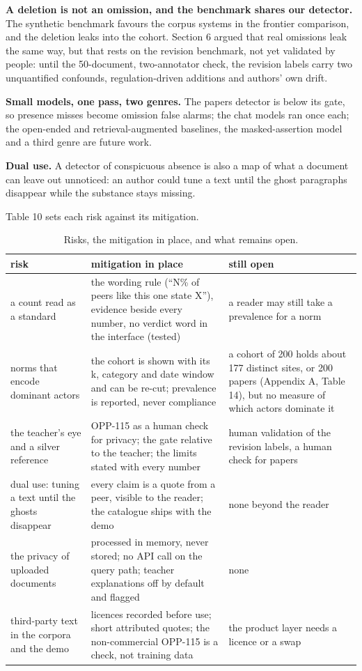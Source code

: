 \documentclass[11pt,a4paper]{article}
\begin{document}
\textbf{A deletion is not an omission, and the benchmark shares our detector.} The synthetic benchmark favours the corpus systems in the frontier comparison, and the deletion leaks into the cohort. Section 6 argued that real omissions leak the same way, but that rests on the revision benchmark, not yet validated by people: until the 50-document, two-annotator check, the revision labels carry two unquantified confounds, regulation-driven additions and authors' own drift.

\textbf{Small models, one pass, two genres.} The papers detector is below its gate, so presence misses become omission false alarms; the chat models ran once each; the open-ended and retrieval-augmented baselines, the masked-assertion model and a third genre are future work.

\textbf{Dual use.} A detector of conspicuous absence is also a map of what a document can leave out unnoticed: an author could tune a text until the ghost paragraphs disappear while the substance stays missing.

Table 10 sets each risk against its mitigation.

\begin{table}[!htbp]
\centering\small
\begin{adjustbox}{max width=\linewidth}
\begin{tabular}{P{2.5cm}P{6.2cm}P{6.3cm}}
\toprule
risk & mitigation in place & still open \\
\midrule
a count read as a standard & the wording rule (``N\% of peers like this one state X''), evidence beside every number, no verdict word in the interface (tested) & a reader may still take a prevalence for a norm \\
norms that encode dominant actors & the cohort is shown with its k, category and date window and can be re-cut; prevalence is reported, never compliance & a cohort of 200 holds about 177 distinct sites, or 200 papers (Appendix A, Table 14), but no measure of which actors dominate it \\
the teacher's eye and a silver reference & OPP-115 as a human check for privacy; the gate relative to the teacher; the limits stated with every number & human validation of the revision labels, a human check for papers \\
dual use: tuning a text until the ghosts disappear & every claim is a quote from a peer, visible to the reader; the catalogue ships with the demo & none beyond the reader \\
the privacy of uploaded documents & processed in memory, never stored; no API call on the query path; teacher explanations off by default and flagged & none \\
third-party text in the corpora and the demo & licences recorded before use; short attributed quotes; the non-commercial OPP-115 is a check, not training data & the product layer needs a licence or a swap \\
\bottomrule
\end{tabular}
\end{adjustbox}
\caption{Risks, the mitigation in place, and what remains open.}
\end{table}
\end{document}
